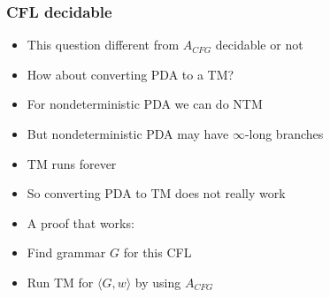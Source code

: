 \begin{frame}[allowframebreaks] \frametitle{CFL decidable}
  \begin{itemize}
\item This question different from $A_{CFG}$ decidable
or not
\item How about converting PDA to a TM?
\item For nondeterministic PDA we can do NTM 
\item But nondeterministic PDA may have $\infty$-long branches

\item [] TM runs forever
\item So converting PDA to TM does not really work
\item A proof that works:

\item [] Find grammar $G$ for this CFL
\item [] Run TM for $\langle  G,w\rangle $ by using 
$A_{CFG}$
\end{itemize}\end{frame}



